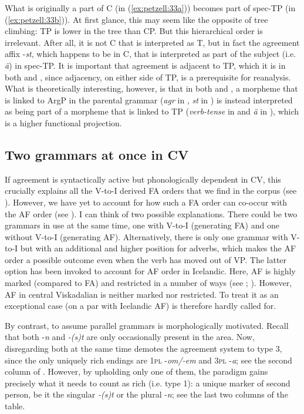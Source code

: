 \documentclass[output=paper,colorlinks,citecolor=brown,draft,draftmode]{langscibook}
\begin{document}
What is originally a part of C (in (\ref{ex:petzell:33a})) becomes part of spec-TP (in (\ref{ex:petzell:33b})). At first glance, this may seem like the opposite of tree climbing: TP is lower in the tree than CP. But this hierarchical order is irrelevant. After all, it is not C that is interpreted as T, but in fact the agreement affix -\textit{st}, which happens to be in C, that is interpreted as part of the subject (i.e. \textit{ä}) in spec-TP. It is important that agreement is adjacent to TP, which it is in both  and , since adjacency, on either side of TP, is a prerequisite for reanalysis. What is theoretically interesting, however, is that in both  and , a morpheme that is linked to ArgP in the parental grammar (\textit{agr} in , \textit{st} in ) is instead interpreted as being part of a morpheme that is linked to TP (\textit{verb-tense} in  and \textit{ä} in ), which is a higher functional projection.


\subsection{Two grammars at once in CV}\label{sec:petzell:5.3}


If agreement is syntactically active but phonologically dependent in CV, this crucially explains all the V-to-I derived FA orders that we find in the corpus (see ). However, we have yet to account for how such a FA order can co-occur with the AF order (see ). I can think of two possible explanations. There could be two grammars in use at the same time, one with V-to-I (generating FA) and one without V-to-I (generating AF). Alternatively, there is only one grammar with V-to-I but with an additional and higher position for adverbs, which makes the AF order a possible outcome even when the verb has moved out of VP. The latter option has been invoked to account for AF order in Icelandic. Here, AF is highly marked (compared to FA) and restricted in a number of ways (see \citealt{BobaljikThrainsson1998}; \citealt{Thrainsson2007,Thrainsson2010}). However, AF in central Viskadalian is neither marked nor restricted. To treat it as an exceptional case (on a par with Icelandic AF) is therefore hardly called for.



By contrast, to assume parallel grammars is morphologically motivated. Recall that both -\textit{n} and \textit{-(s)t} are only occasionally present in the area. Now, disregarding both at the same time demotes the agreement system to type 3, since the only uniquely rich endings are 1\textsc{pl} -\textit{om/-em} and 3\textsc{pl} -\textit{a}; see the second column of . However, by upholding only one of them, the paradigm gains precisely what it needs to count as rich (i.e. type 1): a unique marker of second person, be it the singular \textit{-(s)t} or the plural -\textit{n}; see the last two columns of the table.
\end{document}
